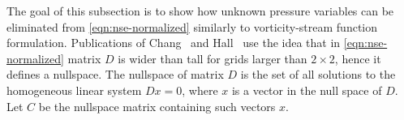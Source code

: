 \documentclass{article}
\numberwithin{equation}{section}
\begin{document}
The goal of this subsection is to show how unknown pressure variables can be eliminated from \cref{eqn:nse-normalized} similarly to vorticity-stream function formulation. 
Publications of Chang~\cite{Chang:2002} and Hall~\cite{Hall:1980} use the idea that in \cref{eqn:nse-normalized} matrix $D$ is wider than tall for grids larger than $2\times 2$, hence it defines a nullspace. 
The nullspace of matrix $D$ is the set of all solutions to the homogeneous linear system $Dx = 0$, where $x$ is a vector in the null space of $D$. Let $C$ be the nullspace matrix containing such vectors $x$. 

%
\end{document}
